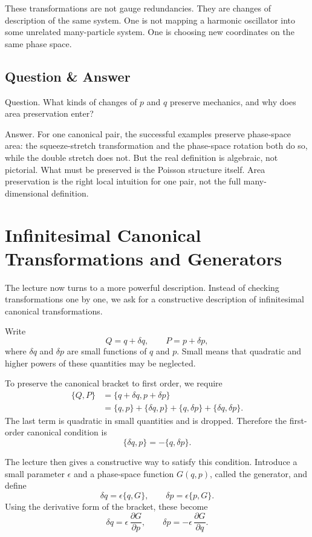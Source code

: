 These transformations are not gauge redundancies. They are changes of description of the same system. One is not mapping a harmonic oscillator into some unrelated many-particle system. One is choosing new coordinates on the same phase space.

\subsection{Question \& Answer}

Question. What kinds of changes of \(p\) and \(q\) preserve mechanics, and why does area preservation enter?

Answer. For one canonical pair, the successful examples preserve phase-space area: the squeeze-stretch transformation and the phase-space rotation both do so, while the double stretch does not. But the real definition is algebraic, not pictorial. What must be preserved is the Poisson structure itself. Area preservation is the right local intuition for one pair, not the full many-dimensional definition.

\section{Infinitesimal Canonical Transformations and Generators}

The lecture now turns to a more powerful description. Instead of checking transformations one by one, we ask for a constructive description of infinitesimal canonical transformations.

Write
\begin{equation}
Q=q+\delta q,\qquad P=p+\delta p,
\end{equation}
where \(\delta q\) and \(\delta p\) are small functions of \(q\) and \(p\). Small means that quadratic and higher powers of these quantities may be neglected.

To preserve the canonical bracket to first order, we require
\begin{align}
\{Q,P\}
&=\{q+\delta q,p+\delta p\} \\
&=\{q,p\}+\{\delta q,p\}+\{q,\delta p\}+\{\delta q,\delta p\}.
\end{align}
The last term is quadratic in small quantities and is dropped. Therefore the first-order canonical condition is
\begin{equation}
\{\delta q,p\}=-\{q,\delta p\}.
\end{equation}

The lecture then gives a constructive way to satisfy this condition. Introduce a small parameter \(\epsilon\) and a phase-space function \(G(q,p)\), called the generator, and define
\begin{equation}
\delta q=\epsilon\{q,G\},\qquad \delta p=\epsilon\{p,G\}.
\end{equation}
Using the derivative form of the bracket, these become
\begin{equation}
\delta q=\epsilon\,\frac{\partial G}{\partial p},\qquad
\delta p=-\epsilon\,\frac{\partial G}{\partial q}.
\end{equation}

